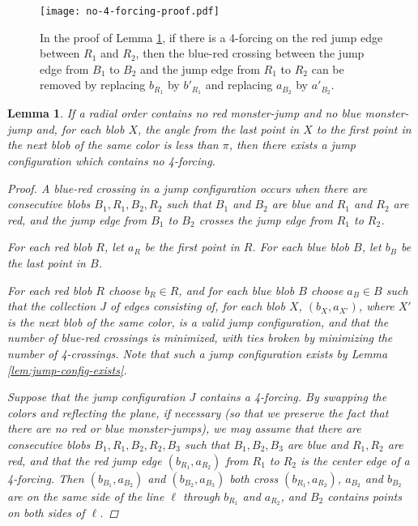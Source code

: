 \documentclass[12pt]{article}
\newtheorem{lemma}{Lemma}
\theoremstyle{definition}
\begin{document}
\begin{figure}
\centering
\texttt{[image: no-4-forcing-proof.pdf]}
\caption{In the proof of Lemma \ref{lem:no-4-forcing}, if there is a 4-forcing on the red jump edge between $R_1$ and $R_2$, then the blue-red crossing between the jump edge from $B_1$ to $B_2$ and the jump edge from $R_1$ to $R_2$ can be removed by replacing $b_{R_1}$ by $b'_{R_1}$ and replacing $a_{B_2}$ by $a'_{B_2}$.}
\label{fig:no-4-forcing-proof}
\end{figure}

\begin{lemma}
  \label{lem:no-4-forcing}
  If a radial order contains no red monster-jump and no blue monster-jump and, for each blob $X$, the angle from the last point in $X$ to the first point in the next blob of the same color is less than $\pi$, then there exists a jump configuration which contains no 4-forcing.
  \begin{proof}
    A \emph{blue-red crossing} in a jump configuration occurs when there are consecutive blobs $B_1,R_1,B_2,R_2$ such that $B_1$ and $B_2$ are blue and $R_1$ and $R_2$ are red, and the jump edge from $B_1$ to $B_2$ crosses the jump edge from $R_1$ to $R_2$.

    For each red blob $R$, let $a_R$ be the first point in $R$.
    For each blue blob $B$, let $b_B$ be the last point in $B$.

    For each red blob $R$ choose $b_R\in R$, and for each blue blob $B$ choose $a_B\in B$ such that the collection $J$ of edges consisting of, for each blob $X$, $(b_X,a_{X'})$, where $X'$ is the next blob of the same color, is a valid jump configuration, and that the number of blue-red crossings is minimized, with ties broken by minimizing the number of 4-crossings.
    Note that such a jump configuration exists by Lemma \ref{lem:jump-config-exists}.

    Suppose that the jump configuration $J$ contains a 4-forcing.
    By swapping the colors and reflecting the plane, if necessary (so that we preserve the fact that there are no red or blue monster-jumps), we may assume that there are consecutive blobs $B_1,R_1,B_2,R_2,B_3$ such that $B_1,B_2,B_3$ are blue and $R_1,R_2$ are red, and that the red jump edge $(b_{R_1},a_{R_2})$ from $R_1$ to $R_2$ is the center edge of a 4-forcing.
    Then $(b_{B_1},a_{B_2})$ and $(b_{B_2},a_{B_3})$ both cross $(b_{R_1},a_{R_2})$, $a_{B_2}$ and $b_{B_2}$ are on the same side of the line $\ell$ through $b_{R_1}$ and $a_{R_2}$, and $B_2$ contains points on both sides of $\ell$.
    

\end{proof}
\end{lemma}
\end{document}
